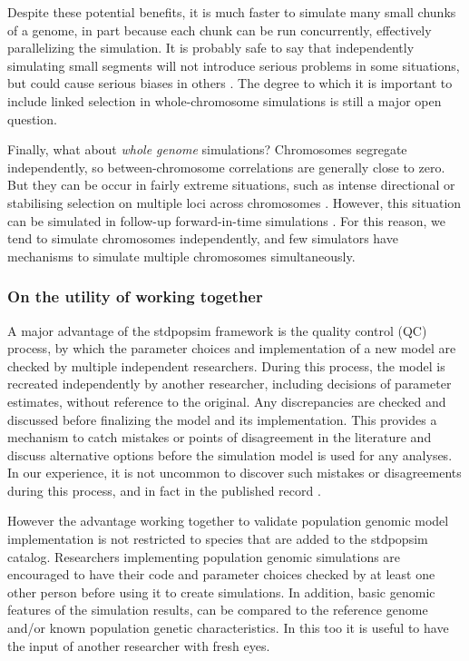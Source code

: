 \documentclass[hidelinks]{article}
\begin{document}
Despite these potential benefits, it is much faster to simulate many
small chunks of a genome, in part because each chunk can be run
concurrently, effectively parallelizing the simulation. It is probably
safe to say that independently simulating small segments will not
introduce serious problems in some situations, but could cause serious
biases in others \citep[e.g.,][]{Nelson2020}. The degree to which it is
important to include linked selection in whole-chromosome simulations is
still a major open question.

Finally, what about \emph{whole genome} simulations? Chromosomes
segregate independently, so between-chromosome correlations are generally close
to zero. But they can be occur in fairly extreme situations, such as intense
directional or stabilising selection on multiple loci across chromosomes
\citep{Bulmer1971, Lara2022}. However, this situation can be simulated in
follow-up forward-in-time simulations \citep{Haller2018, Gaynor2020}. For
this reason, we tend to simulate chromosomes independently, and few
simulators have mechanisms to simulate
multiple chromosomes simultaneously.

\hypertarget{on-the-utility-of-working-together}{%
\subsubsection*{On the utility of working
together}\label{on-the-utility-of-working-together}}

A major advantage of the stdpopsim framework is the quality control (QC)
process, by which the parameter choices and implementation of a new
model are checked by multiple independent researchers. During this
process, the model is recreated independently by another researcher,
including decisions of parameter estimates,
without reference to the original. Any discrepancies are checked and
discussed before finalizing the model and its implementation. This
provides a mechanism to catch mistakes or points of disagreement in 
the literature and discuss alternative options
before the simulation model is used for any analyses. In our experience,
it is not uncommon to discover such mistakes or disagreements during
this process, and in fact in the published record \citep{Ragsdale2020}.

However the advantage working together to validate population genomic
model implementation is not restricted to species that are added to
the stdpopsim catalog. Researchers implementing population genomic
simulations are encouraged to have their code and parameter choices
checked by at least one other person before using it to create
simulations. In addition, basic genomic features of the simulation
results, can be compared to the reference genome and/or known population
genetic characteristics. In this too it is useful to have the input
of another researcher with fresh eyes.
\end{document}
